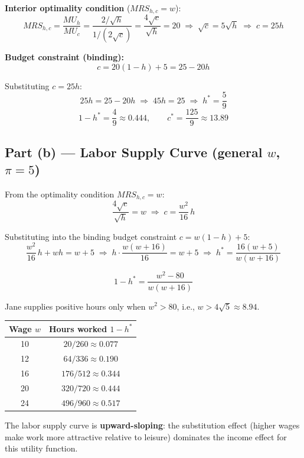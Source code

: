 \documentclass[12pt]{article}
\begin{document}
\textbf{Interior optimality condition} ($MRS_{h,c} = w$):
\[
    MRS_{h,c}
        = \frac{MU_h}{MU_c}
        = \frac{2/\sqrt{h}}{1/(2\sqrt{c})}
        = \frac{4\sqrt{c}}{\sqrt{h}}
        = 20
    \;\Longrightarrow\;
    \sqrt{c} = 5\sqrt{h}
    \;\Longrightarrow\;
    c = 25h
\]

\textbf{Budget constraint (binding):}
\[
    c = 20(1-h) + 5 = 25 - 20h
\]

Substituting $c = 25h$:
\[
    25h = 25 - 20h
    \;\Longrightarrow\;
    45h = 25
    \;\Longrightarrow\;
    h^* = \frac{5}{9}
\]
\[
    \boxed{1 - h^* = \frac{4}{9} \approx 0.444,
    \qquad c^* = \frac{125}{9} \approx 13.89}
\]

\subsection*{Part (b) --- Labor Supply Curve (general $w$, $\pi = 5$)}

From the optimality condition $MRS_{h,c} = w$:
\[
    \frac{4\sqrt{c}}{\sqrt{h}} = w
    \;\Longrightarrow\;
    c = \frac{w^2}{16}\,h
\]

Substituting into the binding budget constraint $c = w(1-h) + 5$:
\[
    \frac{w^2}{16}\,h + wh = w + 5
    \;\Longrightarrow\;
    h\cdot\frac{w(w+16)}{16} = w + 5
    \;\Longrightarrow\;
    h^* = \frac{16(w+5)}{w(w+16)}
\]

\[
    \boxed{1 - h^* = \frac{w^2 - 80}{w(w+16)}}
\]

Jane supplies positive hours only when $w^2 > 80$, i.e., $w > 4\sqrt{5} \approx 8.94$.

\begin{center}
\begin{tabular}{cc}
\toprule
Wage $w$ & Hours worked $1-h^*$ \\
\midrule
10 & $20/260 \approx 0.077$ \\
12 & $64/336 \approx 0.190$ \\
16 & $176/512 \approx 0.344$ \\
20 & $320/720 \approx 0.444$ \\
24 & $496/960 \approx 0.517$ \\
\bottomrule
\end{tabular}
\end{center}

The labor supply curve is \textbf{upward-sloping}: the substitution effect
(higher wages make work more attractive relative to leisure) dominates the
income effect for this utility function.
\end{document}
